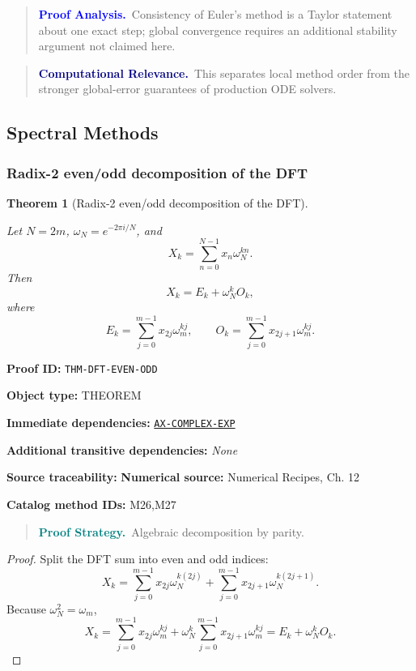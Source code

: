 \documentclass[10pt]{article}
\newcommand{\pidraw}[1]{\begingroup\urlstyle{tt}\nolinkurl{#1}\endgroup}
\newcommand{\pidref}[1]{\hyperref[prf:#1]{\pidraw{#1}}}
\newtheorem{theorem}{Theorem}[section]
\theoremstyle{definition}
\theoremstyle{remark}
\newenvironment{proofstrategy}
{\begin{quote}\small\noindent\textbf{\textcolor{teal}{Proof Strategy.}}\ }
{\end{quote}}
\newenvironment{proofanalysis}
{\begin{quote}\small\noindent\textbf{\textcolor{blue}{Proof Analysis.}}\ }
{\end{quote}}
\newenvironment{computationalrelevance}
{\begin{quote}\small\noindent\textbf{\textcolor{navy}{Computational Relevance.}}\ }
{\end{quote}}
\newcommand{\meta}[2]{\noindent\textbf{#1:} #2\par}
\begin{document}
\begin{proofanalysis}Consistency of Euler's method is a Taylor statement about one exact step; global convergence requires an additional stability argument not claimed here.\end{proofanalysis}

\begin{computationalrelevance}This separates local method order from the stronger global-error guarantees of production ODE solvers.\end{computationalrelevance}

\subsection{Spectral Methods}

\subsubsection{Radix-2 even/odd decomposition of the DFT}

\begin{theorem}[Radix-2 even/odd decomposition of the DFT]\label{prf:THM-DFT-EVEN-ODD}

Let $N=2m$, $\omega_N=e^{-2\pi i/N}$, and
\[
X_k=\sum_{n=0}^{N-1}x_n\omega_N^{kn}.
\]
Then
\[
X_k=E_k+\omega_N^k O_k,
\]
where
\[
E_k=\sum_{j=0}^{m-1}x_{2j}\omega_m^{kj},
\qquad
O_k=\sum_{j=0}^{m-1}x_{2j+1}\omega_m^{kj}.
\]

\end{theorem}

\meta{Proof ID}{\pidraw{THM-DFT-EVEN-ODD}}
\meta{Object type}{THEOREM}
\meta{Immediate dependencies}{\pidref{AX-COMPLEX-EXP}}
\meta{Additional transitive dependencies}{\emph{None}}
\meta{Source traceability}{\textbf{Numerical source:} Numerical Recipes, Ch. 12}
\meta{Catalog method IDs}{M26,M27}

\begin{proofstrategy}Algebraic decomposition by parity.\end{proofstrategy}

\begin{proof}

Split the DFT sum into even and odd indices:
\[
X_k=
\sum_{j=0}^{m-1}x_{2j}\omega_N^{k(2j)}
+
\sum_{j=0}^{m-1}x_{2j+1}\omega_N^{k(2j+1)}.
\]
Because $\omega_N^2=\omega_m$,
\[
X_k=
\sum_{j=0}^{m-1}x_{2j}\omega_m^{kj}
+
\omega_N^k\sum_{j=0}^{m-1}x_{2j+1}\omega_m^{kj}
=
E_k+\omega_N^kO_k.
\]

\end{proof}
\end{document}
